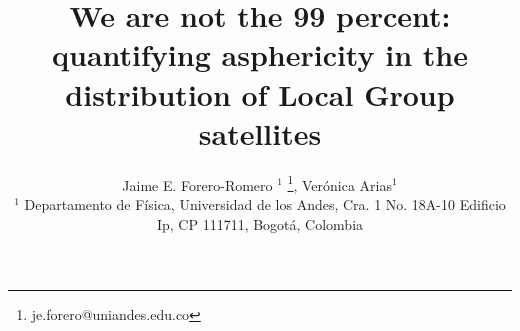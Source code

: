 \documentclass[a4paper,fleqn,usenatbib]{mnras}
\begin{document}
\title[LG satellites distribution asphericity]{We are not the 99 percent: quantifying
  asphericity in the distribution of Local Group satellites}
\author[J.E. Forero-Romero \& V. Arias]
{Jaime E. Forero-Romero $^{1}$ \thanks{je.forero@uniandes.edu.co},
Ver\'onica Arias$^1$\\
$^1$ Departamento de F\'isica, Universidad de los Andes, Cra. 1
  No. 18A-10 Edificio Ip, CP 111711, Bogot\'a, Colombia \\
}

\maketitle
\end{document}
